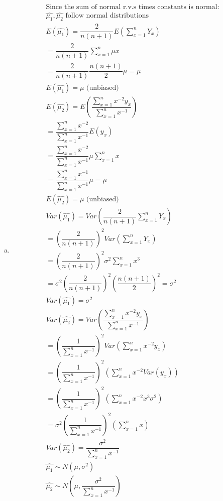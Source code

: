\documentclass{article}
\begin{document}
\begin{flushleft}
\begin{enumerate}[(a)]
	\item 
\begin{multline*}\\
\text{Since the sum of normal r.v.s times constants is normal:}\\
\hat{\mu_1}, \hat{\mu_2} \text{ follow normal distributions}\\
E(\hat{\mu_1})=\dfrac{2}{n(n+1)}E(\sum_{x=1}^{n}Y_x)\\
=\dfrac{2}{n(n+1)}\sum_{x=1}^{n}\mu x\\
=\dfrac{2}{n(n+1)}\dfrac{n(n+1)}{2}\mu=\mu\\
E(\hat{\mu_1})=\mu \text{ (unbiased)}\\
E(\hat{\mu_2})=E\left(\dfrac{\sum_{x=1}^{n}x^{-2}y_x}{\sum_{x=1}^{n}x^{-1}}\right)\\
=\dfrac{\sum_{x=1}^{n}x^{-2}}{\sum_{x=1}^{n}x^{-1}}E(y_x)\\
=\dfrac{\sum_{x=1}^{n}x^{-2}}{\sum_{x=1}^{n}x^{-1}}\mu\sum_{x=1}^{n}x\\
=\dfrac{\sum_{x=1}^{n}x^{-1}}{\sum_{x=1}^{n}x^{-1}}\mu=\mu\\
E(\hat{\mu_2})=\mu \text{ (unbiased)}\\
Var(\hat{\mu_1})=Var\left(\dfrac{2}{n(n+1)}\sum_{x=1}^{n}Y_x\right)\\
=\left(\dfrac{2}{n(n+1)}\right)^2 Var\left(\sum_{x=1}^{n}Y_x\right)\\
=\left(\dfrac{2}{n(n+1)}\right)^2\sigma^2\sum_{x=1}^{n}x^3\\
=\sigma^2\left(\dfrac{2}{n(n+1)}\right)^2\left(\dfrac{n(n+1)}{2}\right)^2=\sigma^2\\
Var(\hat{\mu_1})=\sigma^2\\
Var(\hat{\mu_2})=Var\left(\dfrac{\sum_{x=1}^{n}x^{-2}y_x}{\sum_{x=1}^{n}x^{-1}}\right)\\
=\left(\dfrac{1}{\sum_{x=1}^{n}x^{-1}}\right)^2Var\left(\sum_{x=1}^{n}x^{-2}y_x\right)\\
=\left(\dfrac{1}{\sum_{x=1}^{n}x^{-1}}\right)^2\left(\sum_{x=1}^{n}x^{-2}Var(y_x)\right)\\
=\left(\dfrac{1}{\sum_{x=1}^{n}x^{-1}}\right)^2\left(\sum_{x=1}^{n}x^{-2}x^3\sigma^2\right)\\
=\sigma^2\left(\dfrac{1}{\sum_{x=1}^{n}x^{-1}}\right)^2\left(\sum_{x=1}^{n}x\right)\\
Var(\hat{\mu_2})=\dfrac{\sigma^2}{\sum_{x=1}^{n}x^{-1}}\\
\hat{\mu_1} \sim N(\mu,\sigma^2)\\
\hat{\mu_2} \sim N\left(\mu,\dfrac{\sigma^2}{\sum_{x=1}^{n}x^{-1}}\right)\\
\end{multline*}


\end{enumerate}
\end{flushleft}
\end{document}
